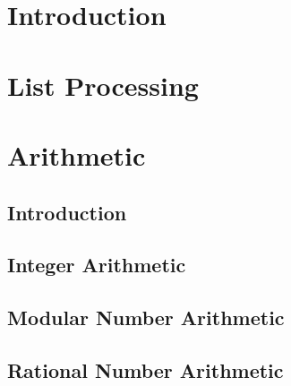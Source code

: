 \documentclass{report}
\begin{document}
\clearpage
{}
\tableofcontents
\clearpage
\listoffigures
\clearpage
{}


\chapter{Introduction}
\label{c:I}




\chapter{List Processing}
\label{c:LP}




\chapter{Arithmetic}
\label{c:A}

\section{Introduction}
\label{c:A s:I}



\section{Integer Arithmetic}
\label{c:A s:IA}



\section{Modular Number Arithmetic}
\label{c:A s:MA}



\section{Rational Number Arithmetic}
\label{c:A s:RA}
\end{document}
